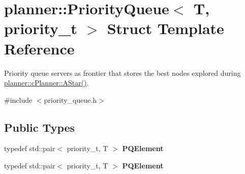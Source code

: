 \hypertarget{structplanner_1_1_priority_queue}{}\section{planner\+:\+:Priority\+Queue$<$ T, priority\+\_\+t $>$ Struct Template Reference}
\label{structplanner_1_1_priority_queue}


Priority queue servers as frontier that stores the best nodes explored during \mbox{\hyperlink{classplanner_1_1c_planner_a341e70531266f023ac9461d18979d1ef}{planner\+::c\+Planner\+::\+A\+Star()}}.  




{\ttfamily \#include $<$priority\+\_\+queue.\+h$>$}

\subsection*{Public Types}
\begin{DoxyCompactItemize}
\item 
\mbox{\label{structplanner_1_1_priority_queue_ae0445a3c85c4e139fcf28479a800f019}} 
typedef std\+::pair$<$ priority\+\_\+t, T $>$ {\bfseries P\+Q\+Element}
\item 
\mbox{\label{structplanner_1_1_priority_queue_ae0445a3c85c4e139fcf28479a800f019}} 
typedef std\+::pair$<$ priority\+\_\+t, T $>$ {\bfseries P\+Q\+Element}
\end{DoxyCompactItemize}
